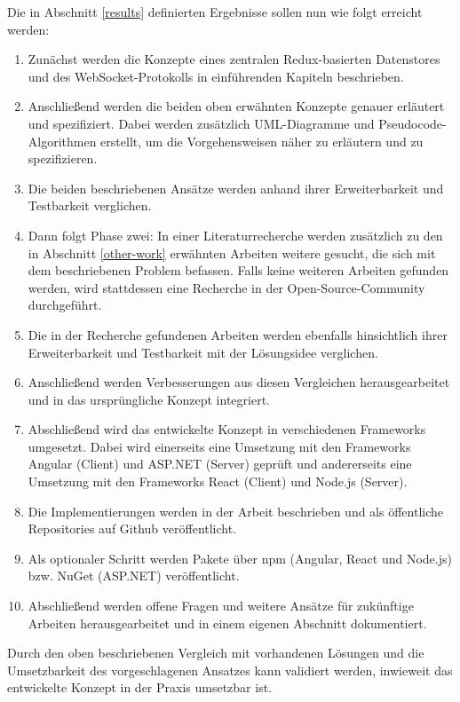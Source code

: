 \documentclass[12pt]{article} %
\begin{document}
Die in Abschnitt \ref{results} definierten Ergebnisse sollen nun wie folgt erreicht werden:
\begin{enumerate}
    \item Zunächst werden die Konzepte eines zentralen Redux-basierten Datenstores und des WebSocket-Protokolls in einführenden Kapiteln beschrieben.
    \item Anschließend werden die beiden oben erwähnten Konzepte genauer erläutert und spezifiziert. Dabei werden zusätzlich UML-Diagramme und Pseudocode-Algorithmen erstellt, um die Vorgehensweisen näher zu erläutern und zu spezifizieren.
    \item Die beiden beschriebenen Ansätze werden anhand ihrer Erweiterbarkeit und Testbarkeit verglichen.
    \item Dann folgt Phase zwei: In einer Literaturrecherche werden zusätzlich zu den in Abschnitt \ref{other-work} erwähnten Arbeiten weitere gesucht, die sich mit dem beschriebenen Problem befassen. Falls keine weiteren Arbeiten gefunden werden, wird stattdessen eine Recherche in der Open-Source-Community durchgeführt.
    \item Die in der Recherche gefundenen Arbeiten werden ebenfalls hinsichtlich ihrer Erweiterbarkeit und Testbarkeit mit der Lösungsidee verglichen.
    \item Anschließend werden Verbesserungen aus diesen Vergleichen herausgearbeitet und in das ursprüngliche Konzept integriert.
    \item Abschließend wird das entwickelte Konzept in verschiedenen Frameworks umgesetzt. Dabei wird einerseits eine Umsetzung mit den Frameworks Angular (Client) und ASP.NET (Server) geprüft und andererseits eine Umsetzung mit den Frameworks React (Client) und Node.js (Server).
    \item Die Implementierungen werden in der Arbeit beschrieben und als öffentliche Repositories auf Github veröffentlicht.
    \item Als optionaler Schritt werden Pakete über npm (Angular, React und Node.js) bzw. NuGet (ASP.NET) veröffentlicht.
    \item Abschließend werden offene Fragen und weitere Ansätze für zukünftige Arbeiten herausgearbeitet und in einem eigenen Abschnitt dokumentiert.
\end{enumerate}

Durch den oben beschriebenen Vergleich mit vorhandenen Lösungen und die Umsetzbarkeit des vorgeschlagenen Ansatzes kann validiert werden, inwieweit das entwickelte Konzept in der Praxis umsetzbar ist.
\end{document}
